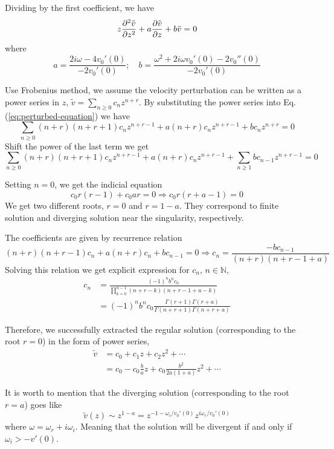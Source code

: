 Dividing by the first coefficient, we have
\begin{equation}
	z\pdv[2]{\tilde{v}}{z} + a\pdv{\tilde{v}}{z} + b\tilde{v} = 0
	\label{eq:perturbed-equation}
\end{equation}
where
\[ a = \frac{2i\omega - 4v_0'(0)}{-2v_0'(0)}; \quad
	b = \frac{\omega^2 + 2i\omega v_0'(0) - 2v_0''(0)}{-2v_0'(0)}
\]

Use Frobenius method, we assume the velocity perturbation can be written as a power series in $z$,  $\tilde{v} = \sum_{n\geq 0}c_nz^{n+r}$. By substituting the power series into Eq.(\ref{eq:perturbed-equation}) we have
\[ \sum_{n \geq 0} (n+r)(n+r+1) c_n z^{n+r-1} + a(n+r)c_nz^{n+r-1} + bc_nz^{n+r} = 0\]
Shift the power of the last term we get
\[ \sum_{n \geq 0} (n+r)(n+r+1) c_n z^{n+r-1} + a(n+r)c_nz^{n+r-1} + \sum_{n \geq 1} bc_{n-1}z^{n+r-1} = 0\]

Setting $n=0$, we get the indicial equation
\[ c_0 r(r-1) + c_0 ar = 0 \Rightarrow c_0r(r+a-1) = 0 \]
We get two different roots, $r=0$ and $r=1-a$. They correspond to finite solution and diverging solution near the singularity, respectively.

The coefficients are given by recurrence relation
\[ (n+r)(n+r-1)c_n + a(n+r)c_n + bc_{n-1} = 0
	\Rightarrow
	c_n = \frac{-bc_{n-1}}{(n+r)(n+r-1+a)}
\]
Solving this relation we get explicit expression for $c_n$, $n\in\mathbb{N}$,
\begin{equation}
	\begin{aligned}
		c_n & = \frac{(-1)^n b^n c_0}{\prod_{k=0}^{n-1} (n+r-k)(n+r-1+a-k)}              \\
		    & = (-1)^n b^n c_0 \frac{\Gamma(r+1)\Gamma(r+a)}{\Gamma(n+r+1)\Gamma(n+r+a)}
	\end{aligned}
	\label{eq:coefficient}
\end{equation}

Therefore, we successfully extracted the regular solution (corresponding to the root $r=0$) in the form of power series,
\begin{equation} \label{eq:regular-solution}
	\begin{aligned}
		\tilde{v} & = c_0 + c_1z + c_2z^2 + \cdots                               \\
		          & = c_0 - c_0\frac{b}{a}z + c_0\frac{b^2}{2a(1+a)}z^2 + \cdots
	\end{aligned}
\end{equation}

It is worth to mention that the diverging solution (corresponding to the root $r=a$) goes like
\[ \tilde{v}(z) \sim z^{1-a} = z^{-1-\omega_i/v_0'(0)}z^{i\omega_r/v_0'(0)}  \]
where $\omega = \omega_r + i\omega_i$. Meaning that the solution will be divergent if and only if $\omega_i > -v'(0)$.

